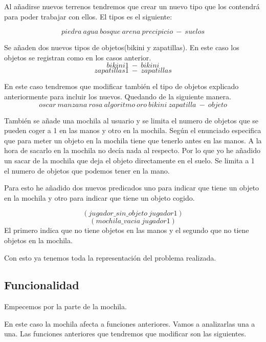 \documentclass[]{article}
\begin{document}
Al añadirse nuevos terrenos tendremos que crear un nuevo tipo que los contendrá para poder trabajar con ellos. El tipos es el siguiente: 

$$
piedra\ agua\ bosque\ arena\ precipicio\ -\ suelos
$$

Se añaden dos nuevos tipos de objetos(bikini y zapatillas). En este caso los objetos se registran como en los casos anterior. 
$$
bikini1\ -\ bikini
$$
$$
zapatillas1\ -\ zapatillas
$$

En este caso tendremos que modificar también el tipo de objetos explicado anteriormente para incluir los nuevos. Quedando de la siguiente manera.
$$
oscar\ manzana\ rosa\ algoritmo\ oro\ bikini\ zapatilla\ -\ objeto
$$

También se añade una mochila al usuario y se limita el numero de objetos que se pueden coger a 1 en las manos y otro en la mochila. Según el enunciado especifica que para meter un objeto en la mochila tiene que tenerlo antes en las manos. A la hora de sacarlo en la mochila no decía nada al respecto. Por lo que yo he añadido un sacar de la mochila que deja el objeto directamente en el suelo. Se limita a 1 el numero de objetos que podemos tener en la mano. 

Para esto he añadido dos nuevos predicados uno para indicar que tiene un objeto en la mochila y otro para indicar que tiene un objeto cogido.

$$
(jugador\_sin\_objeto\ jugador1)
$$
$$
(mochila\_vacia\ jugador1)
$$
El primero indica que no tiene objetos en las manos y el segundo que no tiene objetos en la mochila.

Con esto ya tenemos toda la representación del problema realizada. 

\subsection{Funcionalidad}
Empecemos por la parte de la mochila. 

En este caso la mochila afecta a funciones anteriores. Vamos a analizarlas una a una.
Las funciones anteriores que tendremos que modificar son las siguientes.
\end{document}
